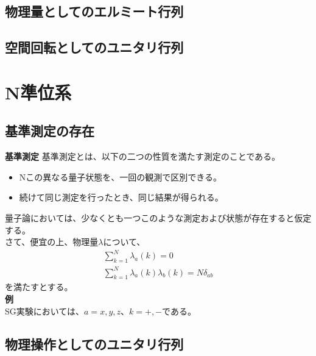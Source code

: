 \documentclass[a4paper,11pt]{jsarticle}
\begin{document}
\subsection{物理量としてのエルミート行列}

\subsection{空間回転としてのユニタリ行列}

\section{N準位系}
\subsection{基準測定の存在}
\begin{itembox}[l]{\textbf{基準測定}}
    基準測定とは、以下の二つの性質を満たす測定のことである。
    \begin{itemize}
        \item Nこの異なる量子状態を、一回の観測で区別できる。
        \item 続けて同じ測定を行ったとき、同じ結果が得られる。
    \end{itemize}
\end{itembox}
量子論においては、少なくとも一つこのような測定および状態が存在すると仮定する。\\
さて、便宜の上、物理量$\lambda$について、
\begin{align}
    \sum_{k=1}^{N} \lambda_a(k)= 0\\
    \sum_{k=1}^{N} \lambda_a(k)\lambda_b(k)= N\delta_{ab}
\end{align}
を満たすとする。\\
\textbf{例}\\
SG実験においては、$a=x,y,z$、$k=+,-$である。\\

\subsection{物理操作としてのユニタリ行列}
\end{document}
